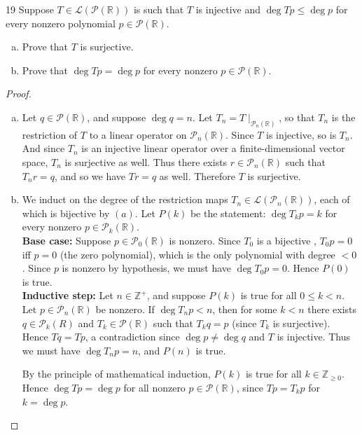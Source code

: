 \documentclass{extarticle}
\newenvironment{problem}[1]{\begin{prob*}{#1}{}}{\end{prob*}}
\newcommand{\Z}{\mathbb{Z}}
\newcommand{\R}{\mathbb{R}}
\newcommand{\poly}{\mathcal{P}}
\newcommand{\Hom}{\mathcal{L}}
\begin{document}
\begin{problem}{19}
Suppose $T\in\Hom(\poly(\R))$ is such that $T$ is injective and $\deg Tp\leq \deg p$ for every nonzero polynomial $p\in\poly(\R)$.
\begin{enumerate}[(a)]
\item Prove that $T$ is surjective.
\item Prove that $\deg Tp = \deg p$ for every nonzero $p\in\poly(\R)$.  
\end{enumerate}
\end{problem}
\begin{proof}
\begin{enumerate}[(a)]
\item Let $q\in\poly(\R)$, and suppose $\deg q = n$.  Let $T_n = T\mid_{\poly_n(\R)}$, so that $T_n$ is the restriction of $T$ to a linear operator on $\poly_n(\R)$.  Since $T$ is injective, so is $T_n$.  And since $T_n$ is an injective linear operator over a finite-dimensional vector space, $T_n$ is surjective as well.  Thus there exists $r\in\poly_n(\R)$ such that $T_nr = q$, and so we have $Tr = q$ as well.  Therefore $T$ is surjective.
\item We induct on the degree of the restriction maps $T_n\in\Hom(\poly_n(\R))$, each of which is bijective by $(a)$.  Let $P(k)$ be the statement: $\deg T_k p = k$ for every nonzero $p\in\poly_k(\R)$.\\
\textbf{Base case:} Suppose $p\in\poly_0(\R)$ is nonzero.  Since $T_0$ is a bijective , $T_0p = 0$ iff $p = 0$ (the zero polynomial), which is the only polynomial with degree $< 0$.  Since $p$ is nonzero by hypothesis, we must have $\deg T_0p = 0$.  Hence $P(0)$ is true.\\
\textbf{Inductive step:} Let $n\in\Z^+$, and suppose $P(k)$ is true for all $0\leq k < n$.  Let $p\in\poly_{n}(\R)$ be nonzero.  If $\deg T_{n}p < n$, then for some $k < n$ there exists $q\in\poly_k(R)$ and $T_k\in\poly(\R)$ such that $T_kq = p$ (since $T_k$ is surjective).  Hence $Tq = Tp$, a contradiction since $\deg p\neq \deg q$ and $T$ is injective.  Thus we must have $\deg T_{n}p = n$, and $P(n)$ is true.
\par By the principle of mathematical induction, $P(k)$ is true for all $k\in\Z_{\geq 0}$.  Hence $\deg Tp = \deg p$ for all nonzero $p\in\poly(\R)$, since $Tp = T_k p$ for $k = \deg p$. \qedhere
\end{enumerate}
\end{proof}

\end{document}
